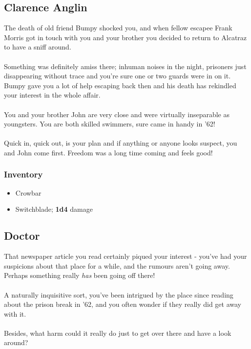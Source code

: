 \documentclass[12pt,a4paper]{article}
\begin{document}

\newpage
\subsection*{Clarence Anglin}
The death of old friend Bumpy shocked you, and when fellow escapee Frank Morris got in touch with you and your brother you decided to return to Alcatraz to have a sniff around.\\\\
Something was definitely amiss there; inhuman noises in the night, prisoners just disappearing without trace and you're sure one or two guards were in on it.  Bumpy gave you a lot of help escaping back then and his death has rekindled your interest in the whole affair.\\\\
You and your brother John are very close and were virtually inseparable as youngsters.  You are both skilled swimmers, sure came in handy in '62!\\\\
Quick in, quick out, is your plan and if anything or anyone looks suspect, you and John come first.  Freedom was a long time coming and feels good!
\subsubsection*{Inventory}
\begin{itemize}
\item{Crowbar}
\item{Switchblade; \textbf{1d4} damage}
\end{itemize}
\newpage
\subsection*{Doctor}
That newspaper article you read certainly piqued your interest - you've had your suspicions about that place for a while, and the rumours aren't going away.  Perhaps something really \textit{has} been going off there!\\\\
A naturally inquisitive sort, you've been intrigued by the place since reading about the prison break in '62, and you often wonder if they really did get away with it.\\\\
Besides, what harm could it really do just to get over there and have a look around?
\end{document}
